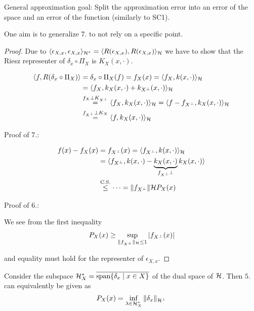 \begin{aremark}
    General approximation goal: Split the approximation error into an error of the space and an error of the function (similarly to SC1).


    One aim is to generalize 7. to not rely on a specific point.
\end{aremark}

\begin{proof}
    Due to $\langle\epsilon_{X,x},\epsilon_{X,x}\rangle_{\mathcal{H}^*}=\langle R(\epsilon_{X,x}),R(\epsilon_{X,x})\rangle_{\mathcal{H}}$
    we have to show that the Riesz representer of $\delta_x\circ \Pi_X$ is $K_X(x,\cdot)$.

    \begin{align*}
        \langle f,R(\delta_x\circ\Pi_X)\rangle &= \delta_x\circ \Pi_X(f) = f_X(x)=\langle f_X,k(x,\cdot)\rangle_{\mathcal{H}}\\
        &=\langle f_X,k_X(x,\cdot)+k_{X^\perp}(x,\cdot) \rangle_{\mathcal{H}}\\
        &\stackrel{f_X\perp K_{X^\perp}}{=}\langle f_X,k_X(x,\cdot)\rangle_{\mathcal{H}}=\langle f-f_{X^\perp},k_X(x,\cdot)\rangle_{\mathcal{H}}\\
        &\stackrel{f_{X^\perp}\perp K_X}{=}\langle f,k_X(x,\cdot)\rangle_{\mathcal{H}}
    \end{align*}

    Proof of 7.:

    \begin{align*}
        f(x)-f_X(x)&=f_{X^\perp}(x)=\langle f_{X^\perp},k(x,\cdot) \rangle_{\mathcal{H}}\\
        &=\langle f_{X^\perp},k(x,\cdot)-\underbrace{k_X(x,\cdot)}_{ f_{X^\perp}\perp}k_X(x,\cdot)\rangle\\
        &\stackrel{\text{C.S.}}{\leq}\dots=\Vert f_{X^{\perp}}\Vert\mathcal{H} P_X(x) 
    \end{align*}

    Proof of 6.:

    We see from the first inequality 
    \begin{align*}
        P_X(x)\geq \sup_{\Vert f_{X^\perp}\Vert_{\mathcal{H}}\leq 1} |f_{X^\perp}(x)|
    \end{align*}

    and equality must hold for the representer of $\epsilon_{X,x}$.

\end{proof}

\begin{remark}
    Consider the subspace $\mathcal{H}_X^*=\overline{\text{span}\{\delta_x\mid x\in X\}}$ of the 
    dual space of $\mathcal{H}$. Then $5.$ can equivalently be given as 
    \begin{equation}\label{eq:004}
        P_X(x)= \inf_{\lambda\in \mathcal{H}_X^*}\Vert \delta_x\Vert_{\mathcal{H}^\perp}  
    \end{equation} 
\end{remark}



